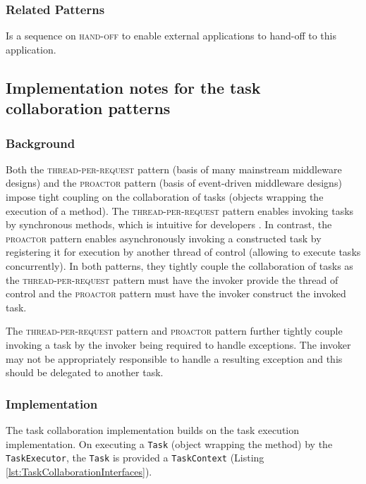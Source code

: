 \documentclass[prodmode]{style/acmlarge}
\begin{document}
\subsubsection*{Related Patterns} Is a sequence on \textsc{hand-off} to enable
external applications to hand-off to this application.



\subsection{Implementation notes for the task collaboration patterns}

\subsubsection*{Background}

Both the \textsc{thread-per-request} pattern \cite{thread-per-request} (basis of
many mainstream middleware designs) and the \textsc{proactor} pattern
\cite{proactor} (basis of event-driven middleware designs) impose tight
coupling on the collaboration of tasks (objects wrapping the execution of a
method).  The \textsc{thread-per-request} pattern enables invoking tasks by
synchronous methods, which is intuitive for developers \cite{proactor}.
In contrast, the \textsc{proactor} pattern enables asynchronously invoking a
constructed task by registering it for execution by another thread of control
(allowing to execute tasks concurrently).  In both patterns, they tightly couple
the collaboration of tasks as the \textsc{thread-per-request} pattern must have
the invoker provide the thread of control and the \textsc{proactor} pattern must
have the invoker construct the invoked task.

The \textsc{thread-per-request} pattern and \textsc{proactor} pattern further
tightly couple invoking a task by the invoker being required to handle
exceptions.  The invoker may not be appropriately responsible to handle a
resulting exception and this should be delegated to another task.


\subsubsection*{Implementation}

The task collaboration implementation builds on the task execution
implementation.  On executing a \texttt{Task} (object wrapping the method) by
the \texttt{TaskExecutor}, the \texttt{Task} is provided a \texttt{TaskContext}
(Listing \ref{lst:TaskCollaborationInterfaces}).
\end{document}
